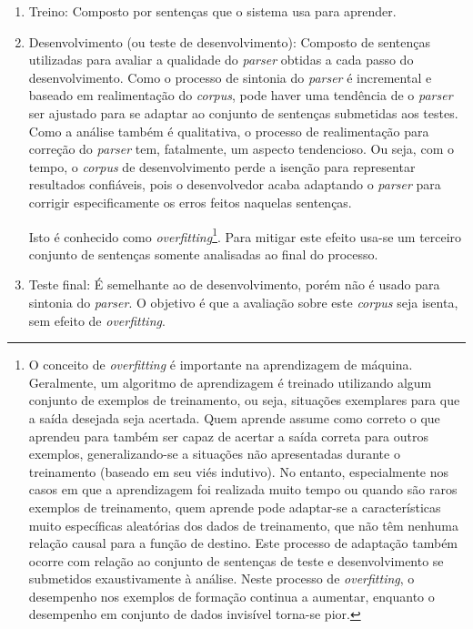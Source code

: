\begin{enumerate}

\item{Treino: Composto por sentenças que o sistema usa para aprender.} %
\label{sub:treino}

\item{Desenvolvimento (ou teste de desenvolvimento): Composto de sentenças utilizadas para avaliar a qualidade do \emph{parser} obtidas a cada passo do desenvolvimento. Como o processo de sintonia do \emph{parser} é incremental e baseado em realimentação do \emph{corpus}, pode haver uma tendência de o \emph{parser} ser ajustado para se adaptar ao conjunto de sentenças submetidas aos testes. Como a análise também é qualitativa, o processo de realimentação para correção do \emph{parser} tem, fatalmente, um aspecto tendencioso. Ou seja, com o tempo, o \emph{corpus} de desenvolvimento perde a isenção para representar resultados confiáveis, pois o desenvolvedor acaba adaptando o \emph{parser} para corrigir especificamente os erros feitos naquelas sentenças. 

Isto é conhecido como \emph{overfitting}\footnote{O conceito de \emph{overfitting} \cite{everitt2002cambridge} é importante na aprendizagem de máquina. Geralmente, um algoritmo de aprendizagem é treinado utilizando algum conjunto de exemplos de treinamento, ou seja, situações exemplares para que a saída desejada seja acertada. Quem aprende assume como correto o que aprendeu para também ser capaz de acertar a saída correta para outros exemplos, generalizando-se a situações não apresentadas durante o treinamento (baseado em seu viés indutivo). No entanto, especialmente nos casos em que a aprendizagem foi realizada muito tempo ou quando são raros exemplos de treinamento, quem aprende pode adaptar-se a características muito específicas aleatórias dos dados de treinamento, que não têm nenhuma relação causal para a função de destino. Este processo de adaptação também ocorre com relação ao conjunto de sentenças de teste e desenvolvimento se submetidos exaustivamente à análise. Neste processo de \emph{overfitting}, o desempenho nos exemplos de formação continua a aumentar, enquanto o desempenho em conjunto de dados invisível torna-se pior.}. Para mitigar este efeito usa-se um terceiro conjunto de sentenças somente analisadas ao final do processo.} 

\label{sub:desenvolvimento_ou_teste_de_desenvolvimento_}

\item{Teste final: É semelhante ao de desenvolvimento, porém não é usado para sintonia do \emph{parser}. O objetivo é que a avaliação sobre este \emph{corpus} seja isenta, sem efeito de \emph{overfitting}.}
\label{sub:teste_final}
\end{enumerate}

